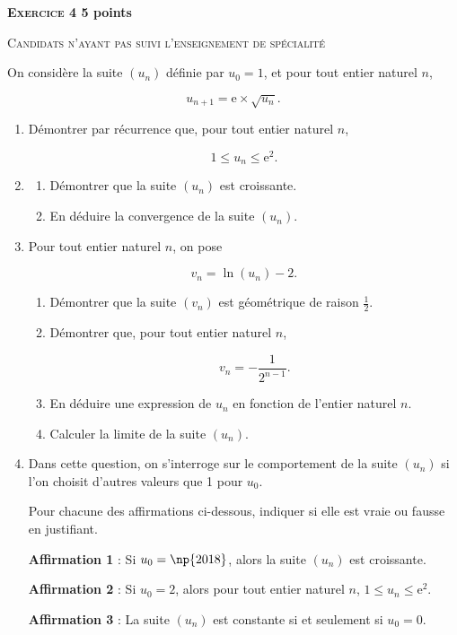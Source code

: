 \documentclass[10pt,a4paper]{article}
\begin{document}
\newpage

\textbf{\textsc{Exercice 4} \hfill 5 points}

\textsc{Candidats n'ayant pas suivi l'enseignement de spécialité}

\bigskip

On considère la suite $\left(u_n\right)$ définie par $u_0 = 1$, et pour tout entier naturel $n$,

\[u_{n+1} = \text{e} \times \sqrt{u_n}.\]

\medskip

\begin{enumerate}
\item Démontrer par récurrence que, pour tout entier naturel $n$,

\[1 \leqslant u_n \leqslant  \text{e}^2.\]
\item 
	\begin{enumerate}
		\item Démontrer que la suite $\left(u_n\right)$ est croissante.
		\item En déduire la convergence de la suite $\left(u_n\right)$.
	\end{enumerate}
\item  Pour tout entier naturel $n$, on pose
	
\[v_n = \ln \left(u_n\right) - 2.\]
	
	\begin{enumerate}
		\item Démontrer que la suite $\left(v_n\right)$ est géométrique de raison $\frac{1}{2}$.
		\item Démontrer que, pour tout entier naturel $n$,

\[v_n = - \dfrac{1}{2^{n-1}}.\]
		
		\item En déduire une expression de $u_n$ en fonction de l'entier naturel $n$.
		\item Calculer la limite de la suite $\left(u_n\right)$.
 	\end{enumerate}
\item  Dans cette question, on s'interroge sur le comportement de la suite $\left(u_n\right)$ si l'on choisit d'autres valeurs que 1 pour $u_0$.
	
Pour chacune des affirmations ci-dessous, indiquer si elle est vraie ou fausse en
justifiant.
	
\medskip
	
\textbf{Affirmation 1} : \og Si $u_0 = \np{2018}$, alors la suite $\left(u_n\right)$ est croissante. \fg
	
\textbf{Affirmation 2} : \og Si $u_0 = 2$, alors pour tout entier naturel $n$,\: $1 \leqslant u_n \leqslant \text{e}^2$. \fg
	
\textbf{Affirmation 3} : \og La suite $\left(u_n\right)$ est constante si et seulement si 
$u_0 = 0$. \fg
\end{enumerate}
\end{document}
